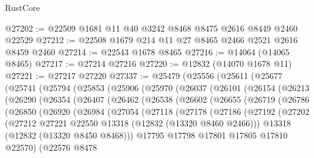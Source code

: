 \begin{lexlean}{RustCore}
\begin{coremodule}
@27202 := @22509 @1681 @11 @40 @3242 @8468 @8475 @2616 @8449 @2460 @22529
@27212 := @22508 @1679 @214 @11 @27 @8465 @2466 @2521 @2616 @8459 @2460
@27214 := @22543 @1678 @8465
@27216 := @14064 (@14065 @8465)
@27217 := @27214 @27216
@27220 := @12832 (@14070 @1678 @11)
@27221 := @27217 @27220
@27337 := @25479
    (@25556
      (@25611
        (@25677
          (@25741
            (@25794
              (@25853
                (@25906
                  (@25970
                    (@26037
                      (@26101
                        (@26154
                          (@26213
                            (@26290
                              (@26354
                                (@26407
                                  (@26462
                                    (@26538
                                      (@26602
                                        (@26655
                                          (@26719
                                            (@26786
                                              (@26850
                                                (@26920
                                                  (@26984
                                                    (@27054
                                                      (@27118
                                                        (@27178
                                                          (@27186
                                                            (@27192
                                                              (@27202
                                                                (@27212
                                                                  @27221
                                                                  @22550
                                                                  @13318
                                                                  (@12832 (@13320 @8460 @2466)))
                                                                @13318
                                                                (@12832 (@13320 @8450 @8468)))
                                                              @17795
                                                              @17798
                                                              @17801
                                                              @17805
                                                              @17810
                                                              @22570)
                                                            (@22576
                                                              @8478

\end{coremodule}
\end{lexlean}
